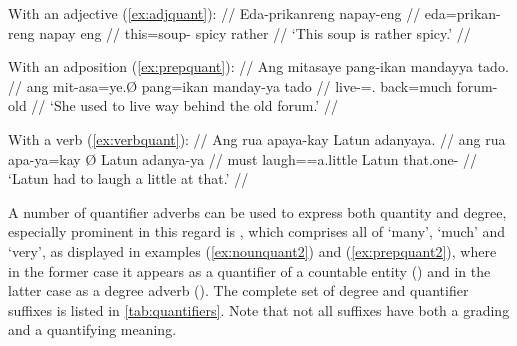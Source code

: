 \a\label{ex:adjquant2}\begingl
	\glpreamble With an adjective (\ref{ex:adjquant}): //
	\gla Eda-prikanreng napay-eng //
	\glb eda=prikan-reng {napay eng} //
	\glc this=soup-\AargI{} {spicy rather} //
	\glft `This soup is rather spicy.' //
\endgl

\a\label{ex:prepquant2}\begingl
	\glpreamble With an adposition (\ref{ex:prepquant}): //
	\gla Ang mitasaye pang-ikan mandayya tado. //
	\glb ang mit-asa=ye.Ø pang=ikan manday-ya tado //
	\glc \AgtT{} live-\Hab{}=\TsgF{}.\Top{} back=much forum-\Loc{} old //
	\glft `She used to live way behind the old forum.' //
\endgl

\a\label{ex:verbquant2}\begingl
	\glpreamble With a verb (\ref{ex:verbquant}): //
	\gla Ang rua apaya-kay {} Latun adanyaya. //
	\glb ang rua apa-ya=kay Ø Latun adanya-ya //
	\glc \AgtT{} must laugh=\TsgM{}=a.little \Top{} Latun that.one-\Loc{} //
	\glft `Latun had to laugh a little at that.' //
\endgl

\xe

A number of quantifier adverbs can be used to express both quantity and 
degree, especially prominent in this regard is , which 
comprises all of `many', `much' and `very', as displayed in examples 
(\ref{ex:nounquant2}) and (\ref{ex:prepquant2}), where in the former case it 
appears as a quantifier of a countable entity 
() and in the latter case as a 
degree adverb (). The complete set of 
degree and quantifier suffixes is listed in \autoref{tab:quantifiers}. Note 
that not all suffixes have both a grading and a quantifying meaning.

